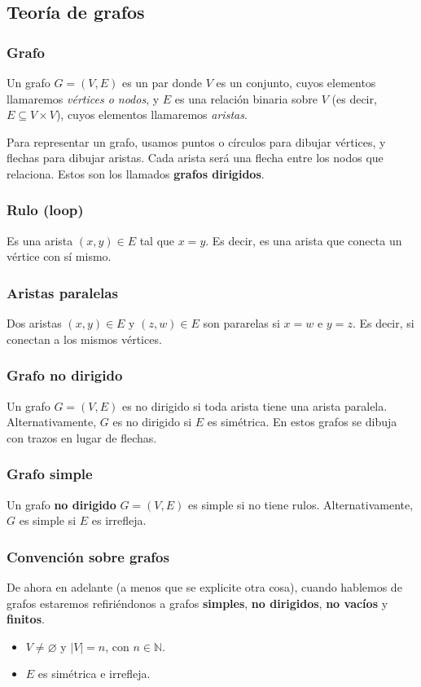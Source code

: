 \begin{multicols}{2}
    \section{Teoría de grafos}
    
    \subsubsection*{Grafo}
    Un grafo $G = (V,E)$ es un par donde $V$ es un conjunto, cuyos elementos llamaremos \textit{vértices o nodos}, y $E$ es una relación binaria sobre $V$ (es decir, $E \subseteq V \times V$), cuyos elementos llamaremos \textit{aristas}. \p
    
    Para representar un grafo, usamos puntos o círculos para dibujar vértices, y flechas para dibujar aristas. Cada arista será una flecha entre los nodos que relaciona. Estos son los llamados \textbf{grafos dirigidos}.
    
    \subsubsection*{Rulo (loop)}
    Es una arista $(x,y) \in E$ tal que $x = y$. Es decir, es una arista que conecta un vértice con sí mismo.
    
    \subsubsection*{Aristas paralelas}
    Dos aristas $(x,y) \in E$  y $(z, w) \in E$ son pararelas si $x = w$ e $y = z$. Es decir, si conectan a los mismos vértices.
    
    \subsubsection*{Grafo no dirigido}
    Un grafo $G = (V, E)$ es no dirigido si toda arista tiene una arista paralela. Alternativamente, $G$ es no dirigido si $E$ es simétrica. En estos grafos se dibuja con trazos en lugar de flechas.
    
    \subsubsection*{Grafo simple}
    Un grafo \textbf{no dirigido} $G = (V, E)$ es simple si no tiene rulos. Alternativamente, $G$ es simple si $E$ es irrefleja.
    
    \subsubsection*{Convención sobre grafos}
    De ahora en adelante (a menos que se explicite otra cosa), cuando hablemos de grafos estaremos refiriéndonos a grafos \textbf{simples}, \textbf{no dirigidos}, \textbf{no vacíos} y \textbf{finitos}.
    \begin{itemize}
        \item $V \neq \varnothing$ y $|V| = n$, con $n \in \mathbb{N}$.
        \item $E$ es simétrica e irrefleja.
    \end{itemize}
    

\end{multicols}
